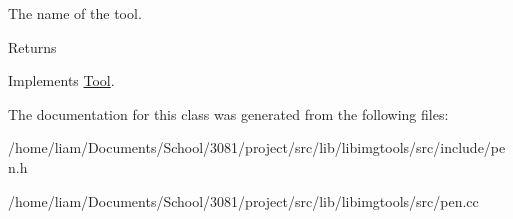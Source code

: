 The name of the tool. 

\begin{DoxyReturn}{Returns}

\end{DoxyReturn}


Implements \hyperlink{classTool_a89abd746706ed78911924a47928d6d06}{Tool}.



The documentation for this class was generated from the following files\+:\begin{DoxyCompactItemize}
\item 
/home/liam/\+Documents/\+School/3081/project/src/lib/libimgtools/src/include/pen.\+h\item 
/home/liam/\+Documents/\+School/3081/project/src/lib/libimgtools/src/pen.\+cc\end{DoxyCompactItemize}
